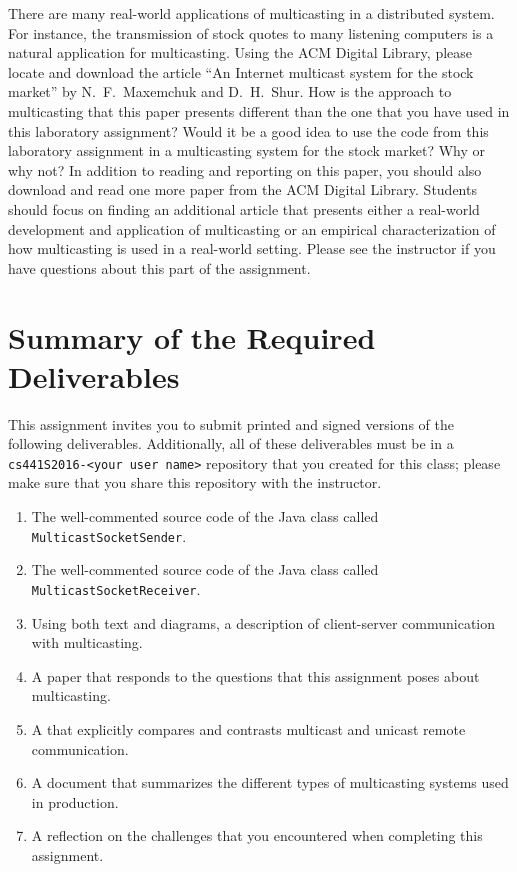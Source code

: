 There are many real-world applications of multicasting in a distributed system. For instance, the transmission of stock
quotes to many listening computers is a natural application for multicasting. Using the ACM Digital Library, please
locate and download the article ``An Internet multicast system for the stock market'' by N.\ F.\ Maxemchuk and D.\ H.\
Shur. How is the approach to multicasting that this paper presents different than the one that you have used in this
laboratory assignment? Would it be a good idea to use the code from this laboratory assignment in a multicasting system
for the stock market? Why or why not? In addition to reading and reporting on this paper, you should also download and
read one more paper from the ACM Digital Library. Students should focus on finding an additional article that presents
either a real-world development and application of multicasting or an empirical characterization of how multicasting is
used in a real-world setting. Please see the instructor if you have questions about this part of the assignment.

\section*{Summary of the Required Deliverables}

This assignment invites you to submit printed and signed versions of the following deliverables. Additionally,
all of these deliverables must be in a {\tt cs441S2016-<your user name>} repository that you created for this class;
please make sure that you share this repository with the instructor.

\vspace*{-.1in}

\begin{enumerate}
  \itemsep 0em

  \item The well-commented source code of the Java class called {\tt MulticastSocketSender}.

  \item The well-commented source code of the Java class called {\tt MulticastSocketReceiver}.

  \item Using both text and diagrams, a description of client-server communication with multicasting.

  \item A paper that responds to the questions that this assignment poses about multicasting.

  \item A that explicitly compares and contrasts multicast and unicast remote communication.

  \item A document that summarizes the different types of multicasting systems used in production.

  \item A reflection on the challenges that you encountered when completing this assignment.

\end{enumerate}

